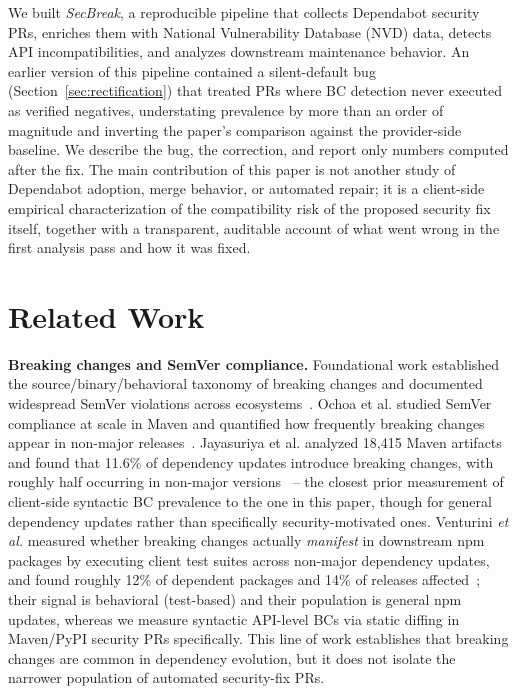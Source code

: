 \documentclass[10pt,journal]{IEEEtran}
\begin{document}
We built \textit{SecBreak}, a reproducible pipeline that collects Dependabot security PRs, enriches them with National Vulnerability Database (NVD) data, detects API incompatibilities, and analyzes downstream maintenance behavior. An earlier version of this pipeline contained a silent-default bug (Section~\ref{sec:rectification}) that treated PRs where BC detection never executed as verified negatives, understating prevalence by more than an order of magnitude and inverting the paper's comparison against the provider-side baseline. We describe the bug, the correction, and report only numbers computed after the fix. The main contribution of this paper is not another study of Dependabot adoption, merge behavior, or automated repair; it is a client-side empirical characterization of the compatibility risk of the proposed security fix itself, together with a transparent, auditable account of what went wrong in the first analysis pass and how it was fixed.

\section{Related Work}
\label{sec:related}

\textbf{Breaking changes and SemVer compliance.} Foundational work established the source/binary/behavioral taxonomy of breaking changes and documented widespread SemVer violations across ecosystems~\cite{dietrich2014semver,
raemaekers2017semver}. Ochoa et al. studied SemVer compliance at scale in Maven
and quantified how frequently breaking changes appear in non-major
releases~\cite{ochoa2022maven}. Jayasuriya et al. analyzed 18,415 Maven
artifacts and found that 11.6\% of dependency updates introduce breaking
changes, with roughly half occurring in non-major versions~\cite{jayasuriya2024emse}
-- the closest prior measurement of client-side syntactic BC prevalence to the
one in this paper, though for general dependency updates rather than
specifically security-motivated ones. Venturini \textit{et al.} measured
whether breaking changes actually \emph{manifest} in downstream npm packages by
executing client test suites across non-major dependency updates, and found
roughly 12\% of dependent packages and 14\% of releases affected~\cite{venturini2023};
their signal is behavioral (test-based) and their population is general npm
updates, whereas we measure syntactic API-level BCs via static diffing in
Maven/PyPI security PRs specifically. This line of work establishes that
breaking changes are common in dependency evolution, but it does not isolate
the narrower population of automated security-fix PRs.
\end{document}
